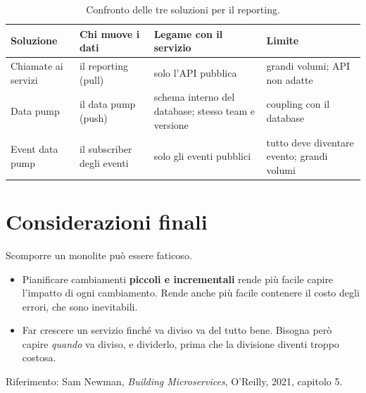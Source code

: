 \begin{table}[ht]
\centering
\small
\caption{Confronto delle tre soluzioni per il reporting.\aggiunta}
\label{tab:split-reporting}
\begin{tabularx}{\linewidth}{>{\raggedright\arraybackslash}p{2.9cm}>{\raggedright\arraybackslash}p{2.6cm}>{\raggedright\arraybackslash}X>{\raggedright\arraybackslash}p{3.2cm}}
\toprule
Soluzione & Chi muove i dati & Legame con il servizio & Limite \\
\midrule
Chiamate ai servizi & il reporting (pull) & solo l'API pubblica & grandi volumi; API non adatte \\
Data pump & il data pump (push) & schema interno del database; stesso team e versione & coupling con il database \\
Event data pump & il subscriber degli eventi & solo gli eventi pubblici & tutto deve diventare evento; grandi volumi \\
\bottomrule
\end{tabularx}
\end{table}

\section{Considerazioni finali}
\label{sec:split-conclusioni}

Scomporre un monolite può essere faticoso.
\begin{itemize}
  \item Pianificare cambiamenti \textbf{piccoli e incrementali} rende più facile capire l'impatto di ogni cambiamento.
    Rende anche più facile contenere il costo degli errori, che sono inevitabili.
  \item Far crescere un servizio finché va diviso va del tutto bene. Bisogna però capire \emph{quando} va diviso, e
    dividerlo, prima che la divisione diventi troppo costosa.
\end{itemize}

Riferimento: Sam Newman, \emph{Building Microservices}, O'Reilly, 2021, capitolo 5.

